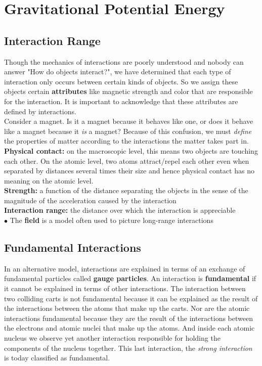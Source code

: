 \section{Gravitational Potential Energy}

    \subsection{Interaction Range}

        Though the mechanics of interactions are poorly understood and nobody can answer "How do objects interact?", we have determined that each type of interaction only occurs between certain kinds of objects. So we
        assign these objects certain \textbf{attributes} like magnetic strength and color that are responsible for the interaction. It is important to acknowledge that these attributes are defined by interactions. \\

        Consider a magnet. Is it a magnet because it behaves like one, or does it behave like a magnet because it \textit{is} a magnet? Because of this confusion, we must \textit{define} the properties of matter
        according to the interactions the matter takes part in. \\

        \textbf{Physical contact:} on the macroscopic level, this means two objects are touching each other. On the atomic level, two atoms attract/repel each other even when separated by distances several times their
        size and hence physical contact has no meaning on the atomic level. \\
        \textbf{Strength:} a function of the distance separating the objects in the sense of the magnitude of the acceleration caused by the interaction \\
        \textbf{Interaction range:} the distance over which the interaction is appreciable \\
        $\bullet$ The \textbf{field} is a model often used to picture long-range interactions




    \subsection{Fundamental Interactions}

        In an alternative model, interactions are explained in terms of an exchange of fundamental particles called \textbf{gauge particles}. An interaction is \textbf{fundamental} if it cannot be explained in terms of
        other interactions. The interaction between two colliding carts is not fundamental because it can be explained as the result of the interactions between the atoms that make up the carts. Nor are the atomic
        interactions fundamental because they are the result of the interactions between the electrons and atomic nuclei that make up the atoms. And inside each atomic nucleus we observe yet another interaction
        responsible for holding the components of the nucleus together. This last interaction, the \textit{strong interaction} is today classified as fundamental. \\

